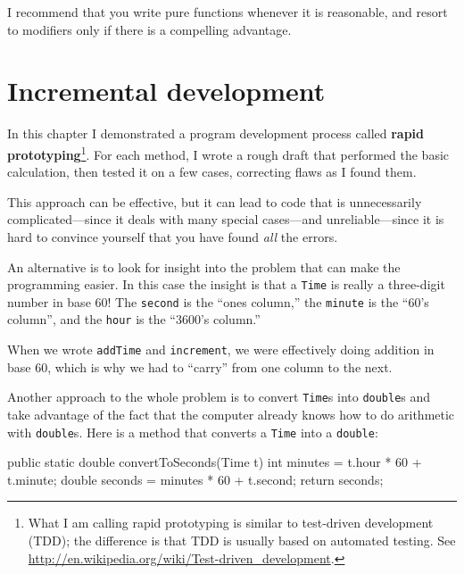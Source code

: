 
I recommend that you write pure functions whenever it is reasonable, and resort to modifiers only if there is a compelling advantage.



\section{Incremental development}


In this chapter I demonstrated a program development process called
{\bf rapid prototyping}\footnote{What I am calling rapid prototyping
  is similar to test-driven development (TDD); the difference is that
  TDD is usually based on automated testing.  See
  \url{http://en.wikipedia.org/wiki/Test-driven_development}.}.  For
each method, I wrote a rough draft that performed the
basic calculation, then tested it on a few cases, correcting flaws
as I found them.

This approach can be effective, but it can lead to code
that is unnecessarily complicated---since it deals with many
special cases---and unreliable---since it is hard to convince
yourself that you have found {\em all} the errors.

An alternative is to look for insight
into the problem that can make the programming easier.  In
this case the insight is that a {\tt Time} is really a three-digit
number in base 60!  The {\tt second} is the ``ones column,''
the {\tt minute} is the ``60's column'', and the {\tt hour}
is the ``3600's column.''

When we wrote {\tt addTime} and {\tt increment}, we were effectively
doing addition in base 60, which is why we had to ``carry'' from one
column to the next.


Another approach to the whole problem is to convert
{\tt Time}s into {\tt double}s and take advantage of the fact that
the computer already knows how to do arithmetic with {\tt double}s.
Here is a method that converts a {\tt Time} into a {\tt double}:

\begin{code}
public static double convertToSeconds(Time t) {
    int minutes = t.hour * 60 + t.minute;
    double seconds = minutes * 60 + t.second;
    return seconds;
}
\end{code}

